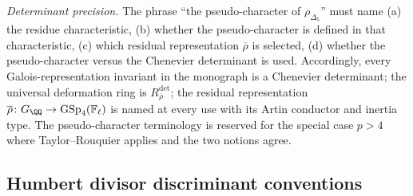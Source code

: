 \begin{theorem}
\emph{Determinant precision.} The phrase ``the pseudo-character of
$\rho_{\Delta_5}$'' must name (a) the
residue characteristic, (b) whether the pseudo-character is defined
in that characteristic, (c) which residual representation
$\overline{\rho}$ is selected, (d) whether the pseudo-character
versus the Chenevier determinant is used.
Accordingly, every Galois-representation invariant in the monograph
is a Chenevier determinant; the universal deformation ring is
$R_{\overline{\rho}}^{\mathrm{det}}$; the residual representation
$\overline{\rho}\colon G_\QQ \to \mathrm{GSp}_4(\mathbb{F}_\ell)$ is
named at every use with its Artin conductor and inertia type. The
pseudo-character terminology is reserved for the special case
$p > 4$ where Taylor--Rouquier applies and the two notions agree.
\end{theorem}

\subsection{Humbert divisor discriminant conventions}
\label{wn:subsec:third-pass-Humbert}

